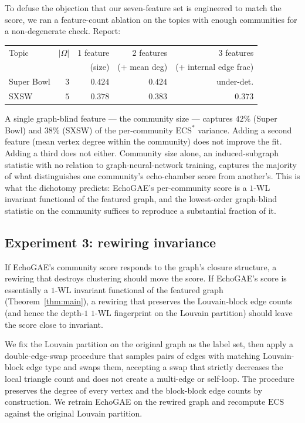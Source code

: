 To defuse the objection that our seven-feature set is engineered
to match the score, we ran a feature-count ablation on the topics
with enough communities for a non-degenerate check. Report:

\begin{center}
\begin{tabular}{lrrrr}
\hline
Topic & $|\Omega|$ & 1 feature & 2 features & 3 features \\
      &            & (size)    & (+ mean deg) & (+ internal edge frac) \\
\hline
Super Bowl & $3$ & $0.424$ & $0.424$ & under-det. \\
SXSW       & $5$ & $0.378$ & $0.383$ & $0.373$ \\
\hline
\end{tabular}
\end{center}

A single graph-blind feature --- the community size --- captures
$42\%$ (Super Bowl) and $38\%$ (SXSW) of the per-community
$\mathrm{ECS}^*$ variance. Adding a second feature (mean vertex
degree within the community) does not improve the fit. Adding a
third does not either. Community size alone, an induced-subgraph
statistic with no relation to graph-neural-network training,
captures the majority of what distinguishes one community's
echo-chamber score from another's. This is what the dichotomy
predicts: EchoGAE's per-community score is a $1$-WL invariant
functional of the featured graph, and the lowest-order graph-blind
statistic on the community suffices to reproduce a substantial
fraction of it.

\subsection{Experiment 3: rewiring invariance}\label{sec:exp-rewire}

If EchoGAE's community score responds to the graph's closure
structure, a rewiring that destroys clustering should move the
score. If EchoGAE's score is essentially a $1$-WL invariant
functional of the featured graph (Theorem~\ref{thm:main}), a rewiring that
preserves the Louvain-block edge counts (and hence the depth-$1$
$1$-WL fingerprint on the Louvain partition) should leave the score
close to invariant.

We fix the Louvain partition on the original graph as the label set,
then apply a double-edge-swap procedure that samples pairs of edges
with matching Louvain-block edge type and swaps them, accepting a
swap that strictly decreases the local triangle count and does not
create a multi-edge or self-loop. The procedure preserves the degree
of every vertex and the block-block edge counts by construction. We
retrain EchoGAE on the rewired graph and recompute
$\mathrm{ECS}$ against the original Louvain partition.


